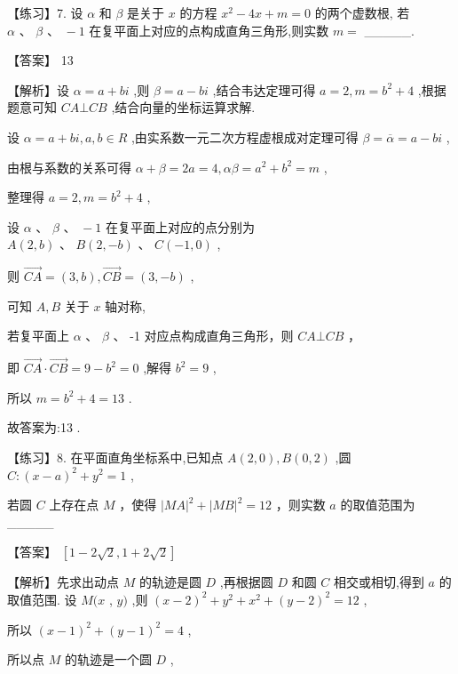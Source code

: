 \documentclass[10pt]{article}
\begin{document}
【练习】7. 设 \(\alpha\) 和 \(\beta\) 是关于 \(x\) 的方程 \({x}^{2} - {4x} + m = 0\) 的两个虚数根, 若 \(\alpha \text{ 、 }\beta \text{ 、 } - 1\) 在复平面上对应的点构成直角三角形,则实数 \(m =\) \_\_\_\_\_.

【答案】 13

【解析】设 \(\alpha  = a + {bi}\) ,则 \(\beta  = a - {bi}\) ,结合韦达定理可得 \(a = 2,m = {b}^{2} + 4\) ,根据题意可知 \({CA} \bot  {CB}\) ,结合向量的坐标运算求解.

设 \(\alpha  = a + {bi},a,b \in  R\) ,由实系数一元二次方程虚根成对定理可得 \(\beta  = \overline{\alpha } = a - {bi}\) ,

由根与系数的关系可得 \(\alpha  + \beta  = {2a} = 4,{\alpha \beta } = {a}^{2} + {b}^{2} = m\) ,

整理得 \(a = 2,m = {b}^{2} + 4\) ,

设 \(\alpha \text{ 、 }\beta \text{ 、 } - 1\) 在复平面上对应的点分别为 \(A\left( {2,b}\right) \text{ 、 }B\left( {2, - b}\right) \text{ 、 }C\left( {-1,0}\right)\) ,

则 \(\overrightarrow{CA} = \left( {3,b}\right) ,\overrightarrow{CB} = \left( {3, - b}\right)\) ,

可知 \(A,B\) 关于 \(x\) 轴对称,

若复平面上 \(\alpha\) 、 \(\beta\) 、 -1 对应点构成直角三角形，则 \({CA} \bot  {CB}\) ，

即 \(\overrightarrow{CA} \cdot  \overrightarrow{CB} = 9 - {b}^{2} = 0\) ,解得 \({b}^{2} = 9\) ,

所以 \(m = {b}^{2} + 4 = {13}\) .

故答案为:13 .

【练习】8. 在平面直角坐标系中,已知点 \(A\left( {2,0}\right) ,B\left( {0,2}\right)\) ,圆 \(C : {\left( x - a\right) }^{2} + {y}^{2} = 1\) ,

若圆 \(C\) 上存在点 \(M\) ，使得 \({\left| MA\right| }^{2} + {\left| MB\right| }^{2} = {12}\) ，则实数 \(a\) 的取值范围为\_\_\_\_\_

【答案】 \(\left\lbrack  {1 - 2\sqrt{2},1 + 2\sqrt{2}}\right\rbrack\)

【解析】先求出动点 \(M\) 的轨迹是圆 \(D\) ,再根据圆 \(D\) 和圆 \(C\) 相交或相切,得到 \(a\) 的取值范围. 设 \(M(x\) , \(y)\) ,则 \({\left( x - 2\right) }^{2} + {y}^{2} + {x}^{2} + {\left( y - 2\right) }^{2} = {12}\) ,

所以 \({\left( x - 1\right) }^{2} + {\left( y - 1\right) }^{2} = 4\) ,

所以点 \(M\) 的轨迹是一个圆 \(D\) ,
\end{document}
